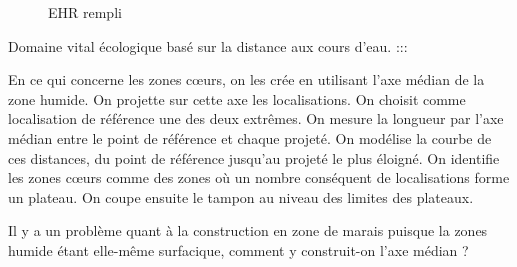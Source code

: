 \documentclass[
  letterpaper,
  DIV=11,
  numbers=noendperiod]{scrreprt}
\begin{document}
\begin{figure}


\caption{\label{fig-ehr-rempli}EHR rempli}

\end{figure}%

Domaine vital écologique basé sur la distance aux cours d'eau. :::

En ce qui concerne les zones cœurs, on les crée en utilisant l'axe
médian de la zone humide. On projette sur cette axe les localisations.
On choisit comme localisation de référence une des deux extrêmes. On
mesure la longueur par l'axe médian entre le point de référence et
chaque projeté. On modélise la courbe de ces distances, du point de
référence jusqu'au projeté le plus éloigné. On identifie les zones cœurs
comme des zones où un nombre conséquent de localisations forme un
plateau. On coupe ensuite le tampon au niveau des limites des plateaux.

\begin{tcolorbox}[enhanced jigsaw, toptitle=1mm, title=\textcolor{quarto-callout-warning-color}{\faExclamationTriangle}\hspace{0.5em}{Problème en zone de marais}, colback=white, toprule=.15mm, titlerule=0mm, rightrule=.15mm, arc=.35mm, breakable, colbacktitle=quarto-callout-warning-color!10!white, left=2mm, opacityback=0, leftrule=.75mm, coltitle=black, colframe=quarto-callout-warning-color-frame, opacitybacktitle=0.6, bottomtitle=1mm, bottomrule=.15mm]

Il y a un problème quant à la construction en zone de marais puisque la
zones humide étant elle-même surfacique, comment y construit-on l'axe
médian ?

\end{tcolorbox}
\end{document}
